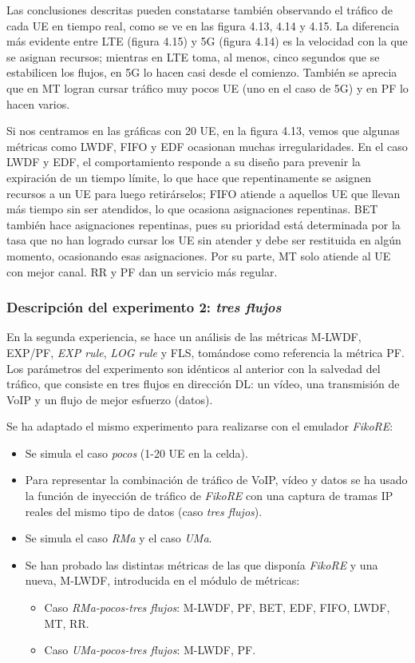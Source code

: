 \documentclass[12pt]{report} %
\begin{document}
Las conclusiones descritas pueden constatarse también observando el tráfico de cada UE en tiempo real, como se ve en las figura 4.13, 4.14 y 4.15.
La diferencia más evidente entre LTE (figura 4.15) y 5G (figura 4.14) es la velocidad con la que se asignan recursos;
mientras en LTE toma, al menos, cinco segundos que se estabilicen los flujos, en 5G lo hacen casi desde el comienzo.
También se aprecia que en MT logran cursar tráfico muy pocos UE (uno en el caso de 5G) y en PF lo hacen varios.

Si nos centramos en las gráficas con 20 UE, en la figura 4.13, vemos que algunas métricas como LWDF, FIFO y EDF ocasionan muchas irregularidades.
En el caso LWDF y EDF, el comportamiento responde a su diseño para prevenir la expiración de un tiempo límite, lo que hace que repentinamente se asignen recursos a un UE para luego retirárselos;
FIFO atiende a aquellos UE que llevan más tiempo sin ser atendidos, lo que ocasiona asignaciones repentinas.
BET también hace asignaciones repentinas, pues su prioridad está determinada por la tasa que no han logrado cursar los UE sin atender y debe ser restituida en algún momento, ocasionando esas asignaciones.
Por su parte, MT solo atiende al UE con mejor canal.
RR y PF dan un servicio más regular.

\subsubsection{Descripción del experimento 2: \textit{tres flujos}}


En la segunda experiencia, se hace un análisis de las métricas M-LWDF, EXP/PF, \textit{EXP rule}, \textit{LOG rule} y FLS, tomándose como referencia la métrica PF.
Los parámetros del experimento son idénticos al anterior con la salvedad del tráfico, que consiste en tres flujos en dirección DL: un vídeo, una transmisión de VoIP y un flujo de mejor esfuerzo (datos).

Se ha adaptado el mismo experimento para realizarse con el emulador \textit{FikoRE}:

\begin{itemize}
\item Se simula el caso \textit{pocos} (1-20 UE en la celda).
\item Para representar la combinación de tráfico de VoIP, vídeo y datos se ha usado la función de inyección de tráfico de \textit{FikoRE} con una captura de tramas IP reales del mismo tipo de datos (caso \textit{tres flujos}).
\item Se simula el caso \textit{RMa} y el caso \textit{UMa}.
\item {
Se han probado las distintas métricas de las que disponía \textit{FikoRE} y una nueva, M-LWDF, introducida en el módulo de métricas:
\begin{itemize}
\item Caso \textit{RMa-pocos-tres flujos}: M-LWDF, PF, BET, EDF, FIFO, LWDF, MT, RR.
\item Caso \textit{UMa-pocos-tres flujos}: M-LWDF, PF.
\end{itemize}
}
\end{itemize}
\end{document}
